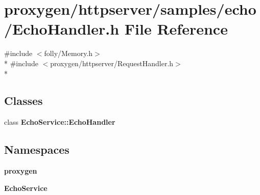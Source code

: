 \section{proxygen/httpserver/samples/echo/\+Echo\+Handler.h File Reference}
\label{EchoHandler_8h}
{\ttfamily \#include $<$folly/\+Memory.\+h$>$}\\*
{\ttfamily \#include $<$proxygen/httpserver/\+Request\+Handler.\+h$>$}\\*
\subsection*{Classes}
\begin{DoxyCompactItemize}
\item 
class {\bf Echo\+Service\+::\+Echo\+Handler}
\end{DoxyCompactItemize}
\subsection*{Namespaces}
\begin{DoxyCompactItemize}
\item 
 {\bf proxygen}
\item 
 {\bf Echo\+Service}
\end{DoxyCompactItemize}
